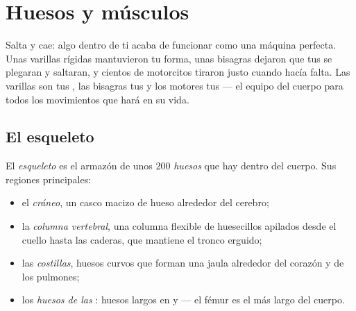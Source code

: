 \chapter{Huesos y músculos}\label{ch:g3:bones-and-muscles}

Salta y cae: algo dentro de ti acaba de funcionar como una máquina
perfecta. Unas varillas rígidas mantuvieron tu forma, unas bisagras
dejaron que tus  se plegaran y saltaran, y cientos de motorcitos
tiraron justo cuando hacía falta. Las varillas son tus , las
bisagras tus  y los motores tus  --- el equipo
del cuerpo para todos los movimientos que hará en su vida.

\section{El esqueleto}

\begin{definition}\label{def:g3:bones-and-muscles:skeleton}
El \emph{esqueleto} es el armazón de unos $200$
\emph{huesos} que hay dentro del cuerpo. Sus regiones
principales:
\begin{itemize}
  \item el \emph{cráneo}, un casco macizo de hueso
        alrededor del cerebro;
  \item la \emph{columna vertebral}, una
        columna flexible de huesecillos apilados desde el cuello hasta
        las caderas, que mantiene el tronco erguido;
  \item las \emph{costillas}, huesos curvos que forman
        una jaula alrededor del corazón y de los pulmones;
  \item los \emph{huesos de las }: huesos largos en 
        y  --- el fémur es el más largo del cuerpo.
\end{itemize}
\end{definition}

